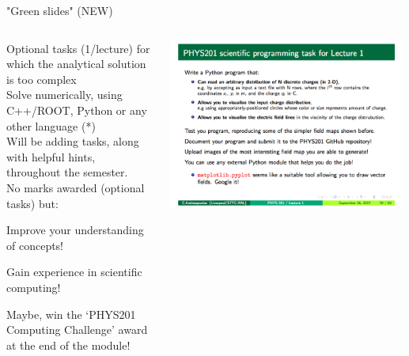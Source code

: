 \begin{frame}{"Green slides" (NEW)}

\begin{columns}
  \begin{column}{0.52\textwidth}
     {\small
      Optional tasks (1/lecture) for which the analytical solution is too complex\\
      \vspace{0.2cm}
      Solve numerically, using C++/ROOT, Python or any other language (*)\\
      \vspace{0.2cm}
      Will be adding tasks, along with helpful hints, throughout the semester.\\
      \vspace{0.2cm}
      No marks awarded (optional tasks) but:
      \begin{itemize}
      {\scriptsize
        \item Improve your understanding of concepts!
        \item Gain experience in scientific computing!
        \item Maybe, win the `PHYS201 Computing Challenge' award at the end of the module!\\
      }
      \end{itemize}
     }
  \end{column}
  \begin{column}{0.48\textwidth}
   \begin{center}
     \includegraphics[width=0.99\textwidth]{./images/example_slides/python.png}\\
   \end{center}
  \end{column}
\end{columns}


\end{frame}
